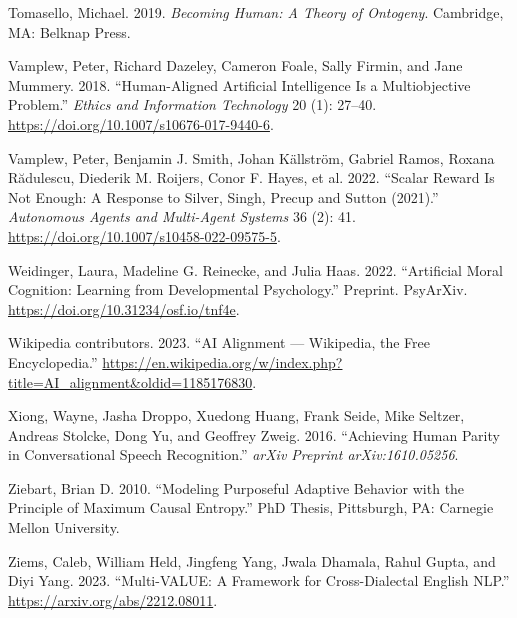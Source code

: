 \documentclass[
  letterpaper,
  DIV=11,
  numbers=noendperiod,
  oneside]{scrreprt}
\newlength{\cslhangindent}
\newenvironment{CSLReferences}[2] %
 {\begin{list}{}{%
  \setlength{\itemindent}{0pt}
  \setlength{\leftmargin}{0pt}
  \setlength{\parsep}{0pt}
  \ifodd #1
   \setlength{\leftmargin}{\cslhangindent}
   \setlength{\itemindent}{-1\cslhangindent}
  \fi
  \setlength{\itemsep}{#2\baselineskip}}}
 {\end{list}}
\theoremstyle{remark}
\begin{document}
\begin{CSLReferences}{1}{0}
Tomasello, Michael. 2019. \emph{Becoming Human: {A} Theory of Ontogeny}.
Cambridge, MA: Belknap Press.

Vamplew, Peter, Richard Dazeley, Cameron Foale, Sally Firmin, and Jane
Mummery. 2018. {``Human-Aligned Artificial Intelligence Is a
Multiobjective Problem.''} \emph{Ethics and Information Technology} 20
(1): 27--40. \url{https://doi.org/10.1007/s10676-017-9440-6}.

Vamplew, Peter, Benjamin J. Smith, Johan Källström, Gabriel Ramos,
Roxana Rădulescu, Diederik M. Roijers, Conor F. Hayes, et al. 2022.
{``Scalar Reward Is Not Enough: A Response to {Silver}, {Singh},
{Precup} and {Sutton} (2021).''} \emph{Autonomous Agents and Multi-Agent
Systems} 36 (2): 41. \url{https://doi.org/10.1007/s10458-022-09575-5}.

Weidinger, Laura, Madeline G. Reinecke, and Julia Haas. 2022.
{``Artificial Moral Cognition: {Learning} from Developmental
Psychology.''} Preprint. PsyArXiv.
\url{https://doi.org/10.31234/osf.io/tnf4e}.

Wikipedia contributors. 2023. {``AI Alignment --- {Wikipedia}{,} the
Free Encyclopedia.''}
\url{https://en.wikipedia.org/w/index.php?title=AI_alignment&oldid=1185176830}.

Xiong, Wayne, Jasha Droppo, Xuedong Huang, Frank Seide, Mike Seltzer,
Andreas Stolcke, Dong Yu, and Geoffrey Zweig. 2016. {``Achieving Human
Parity in Conversational Speech Recognition.''} \emph{arXiv Preprint
arXiv:1610.05256}.

Ziebart, Brian D. 2010. {``Modeling Purposeful Adaptive Behavior with
the Principle of Maximum Causal Entropy.''} PhD Thesis, Pittsburgh, PA:
Carnegie Mellon University.

Ziems, Caleb, William Held, Jingfeng Yang, Jwala Dhamala, Rahul Gupta,
and Diyi Yang. 2023. {``Multi-VALUE: A Framework for Cross-Dialectal
English NLP.''} \url{https://arxiv.org/abs/2212.08011}.

\end{CSLReferences}
\end{document}
